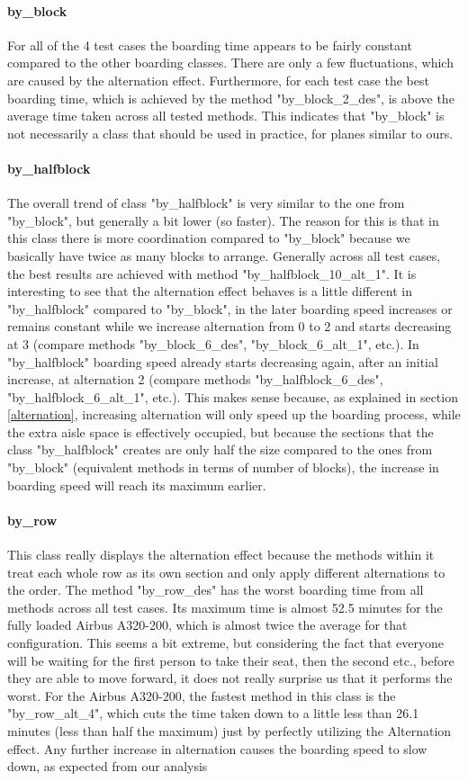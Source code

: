 \documentclass[11pt]{article}
\begin{document}
 \paragraph{by\_block}
 For all of the 4 test cases the boarding time appears to be fairly constant compared to the other boarding classes. There are only a few fluctuations, which are caused by the alternation effect. Furthermore, for each test case the best boarding time, which is achieved by the method "by\_block\_2\_des", is above the average time taken across all tested methods. This indicates that "by\_block" is not necessarily a class that should be used in practice, for planes similar to ours. 
 \paragraph{by\_halfblock}
 The overall trend of class "by\_halfblock" is very similar to the one from "by\_block", but generally a bit lower (so faster). The reason for this is that in this class there is more coordination compared to "by\_block" because we basically have twice as many blocks to arrange. Generally across all test cases, the best results are achieved with method "by\_halfblock\_10\_alt\_1". It is interesting to see that the alternation effect behaves is a little different in "by\_halfblock" compared to "by\_block", in the later boarding speed increases or remains constant while we increase alternation from 0 to 2 and starts decreasing at 3 (compare methods "by\_block\_6\_des", "by\_block\_6\_alt\_1", etc.). In "by\_halfblock" boarding speed already starts decreasing again, after an initial increase, at alternation 2 (compare methods "by\_halfblock\_6\_des", "by\_halfblock\_6\_alt\_1", etc.). This makes sense because, as explained in section \ref{alternation}, increasing alternation will only speed up the boarding process, while the extra aisle space is effectively occupied, but because the sections that the class "by\_halfblock" creates are only half the size compared to the ones from "by\_block" (equivalent methods in terms of number of blocks), the increase in boarding speed will reach its maximum earlier. 
 \paragraph{by\_row}
 This class really displays the alternation effect because the methods within it treat each whole row as its own section and only apply different alternations to the order. The method "by\_row\_des" has the worst boarding time from all methods across all test cases. Its maximum time is almost 52.5 minutes for the fully loaded Airbus A320-200, which is almost twice the average for that configuration. This seems a bit extreme, but considering the fact that everyone will be waiting for the first person to take their seat, then the second etc., before they are able to move forward, it does not really surprise us that it performs the worst. For the Airbus A320-200, the fastest method in this class is the "by\_row\_alt\_4", which cuts the time taken down to a little less than 26.1 minutes (less than half the maximum) just by perfectly utilizing the Alternation effect. Any further increase in alternation causes the boarding speed to slow down, as expected from our analysis
 
\end{document}

